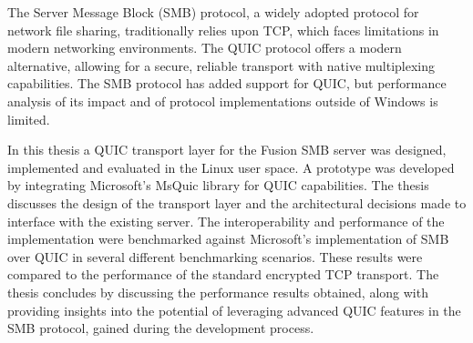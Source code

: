 \documentclass[english, 12pt, a4paper, elec, utf8, a-2b, online]{aaltothesis}
\date{5 November 2025}
\begin{document}
\makecoverpage

\makecopyrightpage

\clearpage

\begin{abstractpage}[english]
	The Server Message Block (SMB) protocol, a widely adopted protocol for network
	file sharing, traditionally relies upon TCP, which faces limitations in modern
	networking environments. The QUIC protocol offers a modern alternative, allowing
	for a secure, reliable transport with native multiplexing capabilities. The SMB
	protocol has added support for QUIC, but performance analysis of its impact and
	of protocol implementations outside of Windows is limited.

	In this thesis a QUIC transport layer for the Fusion SMB server was designed,
	implemented and evaluated in the Linux user space. A prototype was
	developed by integrating Microsoft's MsQuic library for QUIC capabilities. The
	thesis discusses the design of the transport layer and the architectural decisions
	made to interface with the existing server. The interoperability and performance of
	the implementation were benchmarked against
    Microsoft's implementation of SMB over QUIC in several different
	benchmarking scenarios. These results were compared to the performance of the standard
	encrypted TCP transport. The thesis concludes by discussing the performance
	results obtained, along with providing insights into the potential of leveraging
	advanced QUIC features in the SMB protocol, gained during the development process.
\end{abstractpage}

\end{document}

